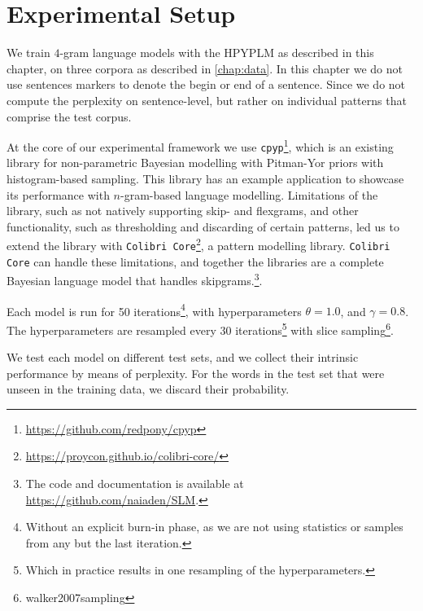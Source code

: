 \section{Experimental Setup}

We train $4$-gram language models with the HPYPLM as described in this chapter, on three corpora as described in \cref{chap:data}. In this chapter we do not use sentences markers to denote the begin or end of a sentence. Since we do not compute the perplexity on sentence-level, but rather on individual patterns that comprise the test corpus.

At the core of our experimental framework we use \texttt{cpyp}\footnote{\url{https://github.com/redpony/cpyp}}, which is an existing library for non-parametric Bayesian modelling with Pitman-Yor priors with histogram-based sampling\cite{blunsom2009note}. This library has an example application to showcase its performance with $n$-gram-based language modelling. Limitations of the library, such as not natively supporting skip- and flexgrams, and other functionality, such as thresholding and discarding of certain patterns, led us to extend the library with \texttt{Colibri Core}\footnote{\url{https://proycon.github.io/colibri-core/}}, a pattern modelling library. \texttt{Colibri Core} can handle these limitations\cite{gompel2016efficient}, and together the libraries are a complete Bayesian language model that handles skipgrams.\footnote{The code and documentation is available at \url{https://github.com/naiaden/SLM}.}.

Each model is run for 50 iterations\footnote{Without an explicit burn-in phase, as we are not using statistics or samples from any but the last iteration.}, with hyperparameters $\theta = 1.0$, and $\gamma = 0.8$. The hyperparameters are resampled every 30 iterations\footnote{Which in practice results in one resampling of the hyperparameters.} with slice sampling\footnote{walker2007sampling}.

We test each model on different test sets, and we collect their intrinsic performance by means of perplexity. For the words in the test set that were unseen in the training data, we discard their probability.

